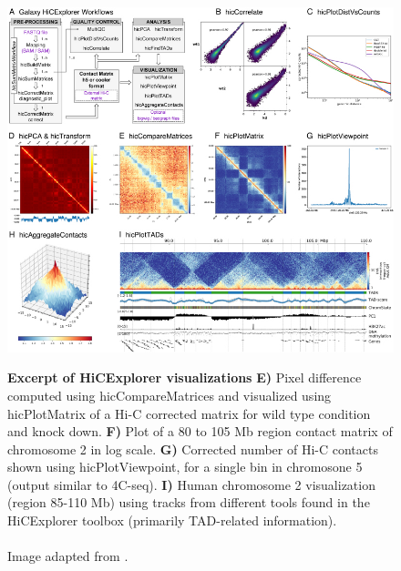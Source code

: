 
\begin{figure}[!htbp]
\begin{centering}
    {\includegraphics[scale=3.8,trim=37 0 0 45,clip]{figures/background/HiCExplorer.jpg}}
    \caption[Excerpt of HiCExplorer visualizations]
    {
        \textbf{Excerpt of HiCExplorer visualizations}
        \textbf{E)} Pixel difference computed using hicCompareMatrices and
        visualized using hicPlotMatrix of a Hi-C corrected matrix for wild type
        condition and knock down.
        \textbf{F)} Plot of a 80 to 105 Mb region contact matrix of chromosome 2 in log scale.
        \textbf{G)} Corrected number of Hi-C contacts shown using
        hicPlotViewpoint, for a single bin in chromosone 5 (output similar to
        4C-seq).
        \textbf{I)} Human chromosome 2 visualization (region 85-110 Mb) using
        tracks from different tools found in the HiCExplorer toolbox (primarily
        TAD-related information). \\
        \\Image adapted from \cite{wolff2018galaxy}.}
    \label{fig:comparison3C}\label{fig:HiCExplorer}
\end{centering}
\end{figure}



